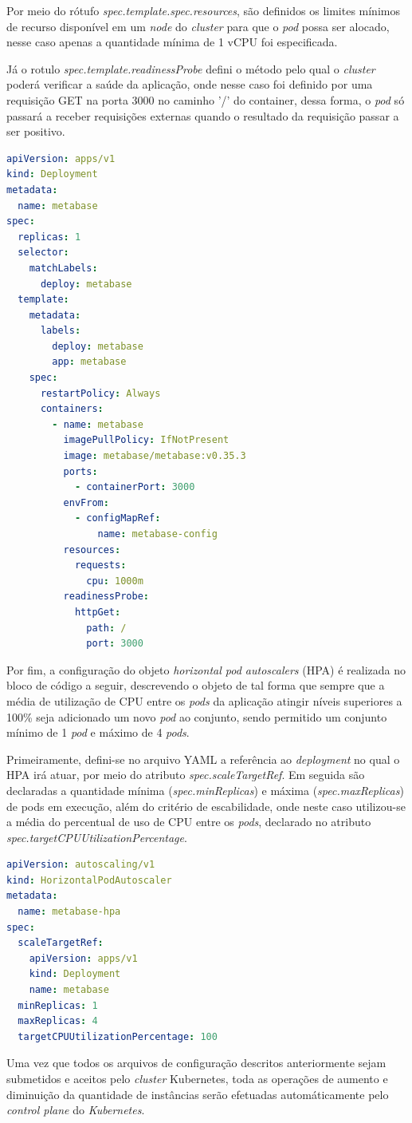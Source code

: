 Por meio do rótufo \textit{spec.template.spec.resources}, são definidos os limites mínimos de recurso disponível em um \textit{node} do \textit{cluster} para que o \textit{pod} possa ser alocado, nesse caso apenas a quantidade mínima de 1 vCPU foi especificada. 

Já o rotulo \textit{spec.template.readinessProbe} defini o método pelo qual o \textit{cluster} poderá verificar a saúde da aplicação, onde nesse caso foi definido por uma requisição GET na porta 3000 no caminho '/' do container, dessa forma, o \textit{pod} só passará a receber requisições externas quando o resultado da requisição passar a ser positivo.

\begin{lstlisting}[language=yaml]
apiVersion: apps/v1
kind: Deployment
metadata:
  name: metabase
spec:
  replicas: 1
  selector:
    matchLabels:
      deploy: metabase
  template:
    metadata:
      labels:
        deploy: metabase
        app: metabase
    spec:
      restartPolicy: Always
      containers:
        - name: metabase
          imagePullPolicy: IfNotPresent
          image: metabase/metabase:v0.35.3
          ports:
            - containerPort: 3000
          envFrom:
            - configMapRef:
                name: metabase-config
          resources:
            requests:
              cpu: 1000m
          readinessProbe:
            httpGet:
              path: /
              port: 3000
\end{lstlisting} 

Por fim, a configuração do objeto \textit{horizontal pod autoscalers} (HPA) é realizada no bloco de código a seguir, descrevendo o objeto de tal forma que sempre que a média de utilização de CPU entre os \textit{pods} da aplicação atingir níveis superiores a 100\% seja adicionado um novo \textit{pod} ao conjunto, sendo permitido um conjunto mínimo de 1 \textit{pod} e máximo de 4 \textit{pods}. 

Primeiramente, defini-se no arquivo YAML a referência ao \textit{deployment} no qual o HPA irá atuar, por meio do atributo \textit{spec.scaleTargetRef}. Em seguida são declaradas a quantidade mínima (\textit{spec.minReplicas}) e máxima (\textit{spec.maxReplicas}) de pods em execução, além do critério de escabilidade, onde neste caso utilizou-se a média do percentual de uso de CPU entre os \textit{pods}, declarado no atributo \textit{spec.targetCPUUtilizationPercentage}.  

\begin{lstlisting}[language=yaml]
apiVersion: autoscaling/v1
kind: HorizontalPodAutoscaler
metadata:
  name: metabase-hpa
spec:
  scaleTargetRef:
    apiVersion: apps/v1
    kind: Deployment
    name: metabase
  minReplicas: 1
  maxReplicas: 4
  targetCPUUtilizationPercentage: 100
\end{lstlisting} 

Uma vez que todos os arquivos de configuração descritos anteriormente sejam submetidos e aceitos pelo \textit{cluster} Kubernetes, toda as operações de aumento e diminuição da quantidade de instâncias serão efetuadas automáticamente pelo \textit{control plane} do \textit{Kubernetes}.  
